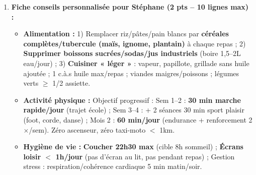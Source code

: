 \documentclass[11pt]{article}
\begin{document}
\begin{corrige}
\begin{enumerate}
\item \textbf{Fiche conseils personnalisée pour Stéphane (2 pts -- 10 lignes max) :}
\begin{itemize}
\item \textbf{Alimentation :} 1) Remplacer riz/pâtes/pain blancs par \textbf{céréales complètes/tubercule (maïs, ignome, plantain)} à chaque repas ; 2) \textbf{Supprimer boissons sucrées/sodas/jus industriels} (boire 1,5--2L eau/jour) ; 3) \textbf{Cuisiner « léger »} : vapeur, papillote, grillade sans huile ajoutée ; 1 c.à.s huile max/repas ; viandes maigres/poissons ; légumes verts $\ge$ 1/2 assiette.
\item \textbf{Activité physique :} Objectif progressif : Sem 1--2 : \textbf{30 min marche rapide/jour} (trajet école) ; Sem 3--4 : + 2 séances 30 min sport plaisir (foot, corde, danse) ; Mois 2 : \textbf{60 min/jour} (endurance + renforcement 2$\times$/sem). Zéro ascenseur, zéro taxi-moto $<$ 1km.
\item \textbf{Hygiène de vie :} \textbf{Coucher 22h30 max} (cible 8h sommeil) ; \textbf{Écrans loisir $<$ 1h/jour} (pas d'écran au lit, pas pendant repas) ; Gestion stress : respiration/cohérence cardiaque 5 min matin/soir.
\end{itemize}
\end{enumerate}
\end{corrige}
\end{document}
